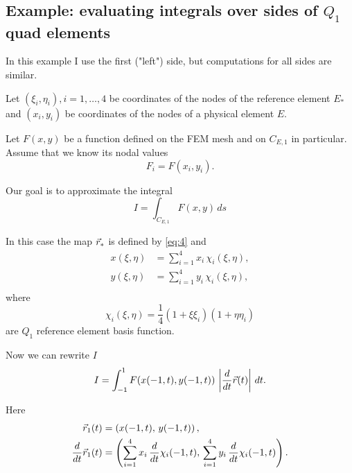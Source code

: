 \documentclass[11pt]{article}
\begin{document}
\subsection{Example: evaluating integrals over sides of $Q_{1}$ quad elements}
\label{sec-3-1}

In this example I use the first ("left") side, but computations for
all sides are similar.

Let $(\xi_{i}, \eta_{i}), i = 1,\dots,4$ be coordinates of the nodes
of the reference element $E_{*}$ and $(x_{i}, y_{i})$ be coordinates
of the nodes of a physical element $E$.

Let $F(x,y)$ be a function defined on the FEM mesh and on $C_{E,1}$ in
particular. Assume that we know its nodal values
\begin{equation}
\label{eq:7}
F_{i} = F(x_{i}, y_{i}).
\end{equation}

Our goal is to approximate the integral
\begin{equation}
\label{eq:8}
I = \int_{C_{E,1}} F(x,y)\, ds
\end{equation}

In this case the map $\vec r_{*}$ is defined by \eqref{eq:4} and
\begin{equation}
\label{eq:9}
\begin{aligned}
x(\xi,\eta) &= \sum_{i=1}^{4} x_{i}\, \chi_{i}(\xi, \eta),\\
y(\xi,\eta) &= \sum_{i=1}^{4} y_{i}\, \chi_{i}(\xi, \eta),\\
\end{aligned}
\end{equation}
where
\begin{equation}
\label{eq:10}
\chi_{i}(\xi,\eta) = \frac14 (1 + \xi\xi_{i})(1 + \eta\eta_{i})
\end{equation}
are $Q_{1}$ reference element basis function.

Now we can rewrite $I$
\begin{equation}
\label{eq:11}
I = \int_{-1}^{1} F(x(-1, t), y(-1, t))\, \left|\frac{d}{dt}\vec r(t) \right|\, dt.
\end{equation}

Here
\begin{align}
\label{eq:12}
\vec r_{1}(t) &= \left( x(-1,t),\, y(-1,t) \right),\\
\frac{d}{dt} \vec r_{1}(t) &= \left( \sum_{i=1}^{4} x_{i}\, \frac{d}{dt}\chi_{i}(-1, t),\,
                                 \sum_{i=1}^{4} y_{i}\, \frac{d}{dt}\chi_{i}(-1, t)  \right).
\end{align}
\end{document}

